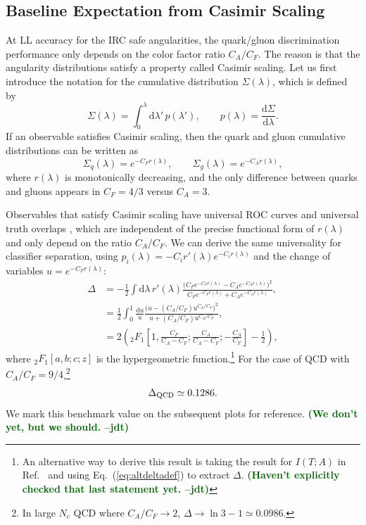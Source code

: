 \documentclass[11pt,letterpaper]{article}
\newcommand{\df}{\text{d}}
\DeclareRobustCommand{\Eq}[1]{Eq.~(\ref{#1})}
\DeclareRobustCommand{\Ref}[1]{Ref.~\cite{#1}}
\newcommand{\be}{\begin{equation}}
\newcommand{\ee}{\end{equation}}
\newcommand{\jdt}[1]{\textbf{\textcolor{darkgreen}{(#1 --jdt)}}}
\begin{document}
\subsection{Baseline Expectation from Casimir Scaling}

At LL accuracy for the IRC safe angularities, the quark/gluon discrimination performance only depends on the color factor ratio $C_A/C_F$.  The reason is that the angularity distributions satisfy a property called Casimir scaling.  Let us first introduce the notation for the cumulative distribution $\Sigma(\lambda)$, which is defined by
\be
\Sigma(\lambda) = \int_0^\lambda \df \lambda' \, p(\lambda'), \qquad p(\lambda) = \frac{\df \Sigma}{\df \lambda}.
\ee
If an observable satisfies Casimir scaling, then the quark and gluon cumulative distributions can be written as
\be
\Sigma_q(\lambda) = e^{-C_F r(\lambda)}, \qquad \Sigma_g(\lambda) = e^{-C_A r(\lambda)},
\ee
where $r(\lambda)$ is monotonically decreasing, and the only difference between quarks and gluons appears in $C_F = 4/3$ versus $C_A = 3$.

Observables that satisfy Casimir scaling have universal ROC curves \cite{} and universal truth overlaps \cite{}, which are independent of the precise functional form of $r(\lambda)$ and only depend on the ratio $C_A/C_F$.  We can derive the same universality for classifier separation, using $p_i(\lambda) = - C_i r'(\lambda) e^{-C_i r(\lambda)}$ and the change of variables $u = e^{-C_F r(\lambda)}$:
\begin{align}
\Delta &=  -\frac{1}{2} \int \df \lambda \, r'(\lambda) \frac{\bigl(C_F e^{-C_F r(\lambda)} - C_A e^{-C_A r(\lambda)}\bigr)^2}{C_F e^{-C_F r(\lambda)}+ C_A e^{-C_A r(\lambda)}} , \\
& = \frac{1}{2} \int_0^1 \frac{\df u}{u} \frac{\bigl(u - (C_A / C_F) u^{C_A/C_F}\bigr)^2}{u + (C_A/C_F) u^{C_A/C_F}} , \\
& = 2 \left({}_2F_1\left[1,\frac{C_F}{C_A - C_F}; \frac{C_A}{C_A - C_F}; - \frac{C_A}{C_F}\right] - \frac{1}{2}  \right),
\end{align}
where ${}_2F_1[a,b;c;z]$ is the hypergeometric function.\footnote{An alternative way to derive this result is taking the result for $I(T;A)$ in \Ref{Larkoski:2014pca} and using \Eq{eq:altdeltadef} to extract $\Delta$.  \jdt{Haven't explicitly checked that last statement yet.}}  For the case of QCD with $C_A/C_F = 9/4$,\footnote{In large $N_c$ QCD where $C_A/C_F \to 2$, $\Delta \to \ln 3 - 1 \simeq 0.0986$.}
\be
\Delta_{\rm QCD} \simeq  0.1286.
\ee
We mark this benchmark value on the subsequent plots for reference.  \jdt{We don't yet, but we should.}  
\end{document}
